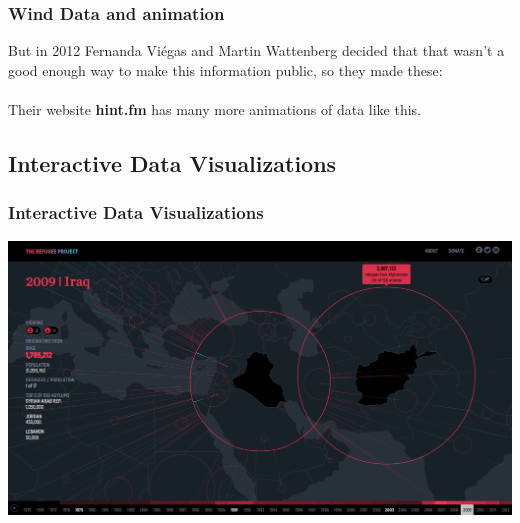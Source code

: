 \documentclass{beamer} %
\newcommand{\1}{\mathbb{1}}
\begin{document}
{		\begin{frame}[t]\frametitle{Wind Data and animation}
		But in 2012 Fernanda Viégas and Martin Wattenberg decided that that wasn't a good enough way to make this information public, so they made these:\\
		\href{http://hint.fm/wind/gallery/oct-29.js.html}{}
		\href{http://hint.fm/wind/gallery/oct-30.js.html}{}\\
		Their website {\bf{hint.fm}} has many more animations of data like this.
		\end{frame}



		\subsection{Interactive Data Visualizations}
		\begin{frame}[t]\frametitle{Interactive Data Visualizations}
		\includegraphics[scale = 0.22]{./visualization/refugee_project.png}\\
		\href{http://www.therefugeeproject.org/}{}\\
		\end{frame}

}
\end{document}
